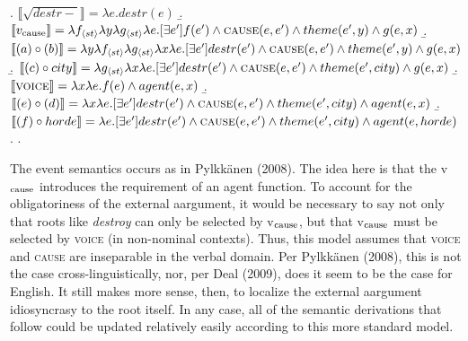 \documentclass[12pt]{article}
\newcommand*{\textsub}[1]{\ensuremath{_\textrm{{\scriptsize #1}}}}
\begin{document}
\a. \begin{math}\llbracket\sqrt{destr-}\rrbracket = \lambda e . destr(e)\end{math}
\b. \begin{math}\llbracket v\textsub{cause}\rrbracket = \lambda f_{\langle st \rangle}\lambda y \lambda g_{\langle st \rangle} \lambda e . [\exists e'] f(e') \land \textsc{cause}(e,e') \land theme(e',y) \land g(e,x) \end{math}
\b. \begin{math}\llbracket (a) \circ (b) \rrbracket = \lambda y \lambda f_{\langle st \rangle} \lambda g_{\langle st \rangle} \lambda x \lambda e . [\exists e'] destr(e') \land \textsc{cause}(e,e') \land theme(e',y) \land g(e,x) \end{math}
\b. \begin{math}\llbracket (c) \circ city\rrbracket = \lambda g_{\langle st \rangle} \lambda x \lambda e . [\exists e'] destr(e') \land \textsc{cause}(e,e') \land theme(e',city) \land g(e,x) \end{math}
\b. \begin{math}\llbracket \textsc{voice}\rrbracket = \lambda x \lambda e . f(e) \land agent(e,x) \end{math}
\b. \begin{math}\llbracket (e) \circ (d) \rrbracket = \lambda x \lambda e . [\exists e'] destr(e') \land \textsc{cause}(e,e') \land theme(e',city) \land agent(e,x) \end{math}
\b. \begin{math}\llbracket (f) \circ horde \rrbracket = \lambda e . [\exists e'] destr(e') \land \textsc{cause}(e,e') \land theme(e',city) \land agent(e,horde) \end{math}
\z. \z. \par

\doublespacing

\noident The event semantics occurs as in Pylkkänen (2008). The idea here is that the v\textsub{cause} introduces the requirement of an agent function. To account for the obligatoriness of the external aargument, it would be necessary to say not only that roots like \textit{destroy} can only be selected by v\textsub{cause}, but that v\textsub{cause} must be selected by \textsc{voice} (in non-nominal contexts). Thus, this model assumes that \textsc{voice} and \textsc{cause} are inseparable in the verbal domain. Per Pylkkänen (2008), this is not the case cross-linguistically, nor, per Deal (2009), does it seem to be the case for English. It still makes more sense, then, to localize the external aargument idiosyncrasy to the root itself. In any case, all of the semantic derivations that follow could be updated relatively easily according to this more standard model.
\end{document}
